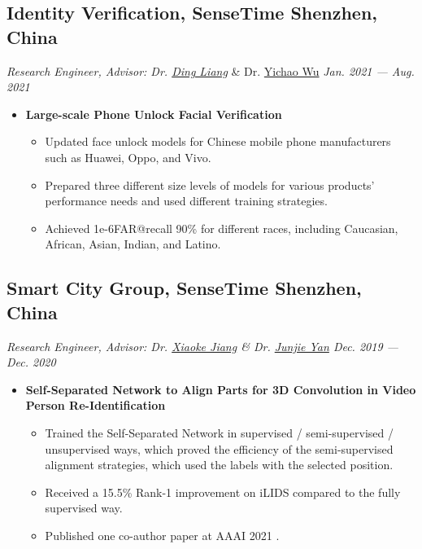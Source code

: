 \documentclass[a4,10pt]{article}
\newcommand{\subtext}[1]{
#1\par\vspace{-0.2cm}}
\newenvironment{zitemize}{
\begin{itemize}\itemsep0pt \parskip0pt \parsep1pt}
{\end{itemize}\vspace{-0.5cm}}
\begin{document}
\subsection*{Identity Verification, SenseTime \hfill Shenzhen, China} 
\subtext{\textit{Research Engineer, Advisor: Dr. \href{https://scholar.google.com/citations?user=Dqjnn0gAAAAJ&hl=zh-CN}{Ding Liang}} \& Dr. \href{https://scholar.google.com/citations?user=20Its9kAAAAJ&hl=en} {Yichao Wu} \hfill \textit{Jan. 2021 --- Aug. 2021}}
    \begin{zitemize}
        \item \textbf{Large-scale Phone Unlock Facial Verification}
            \begin{itemize} 

                \item Updated face unlock models for Chinese mobile phone manufacturers such as Huawei, Oppo, and Vivo.
                \item Prepared three different size levels of models for various products' performance needs and used different training strategies.
                \item Achieved 1e-6FAR@recall 90\% for different races, including Caucasian, African, Asian, Indian,  and Latino.
                
            \end{itemize}
    \end{zitemize}

\subsection*{Smart City Group, SenseTime \hfill Shenzhen, China} 
\subtext{\textit{Research Engineer, Advisor: Dr. \href{https://shockjiang.github.io/} {Xiaoke Jiang}  \& Dr. \href{https://scholar.google.com/citations?user=rEYarG0AAAAJ&hl=en}{Junjie Yan} \hfill Dec. 2019 --- Dec. 2020}}
    \begin{zitemize}
        \item \textbf{Self-Separated Network to Align Parts for 3D Convolution in Video Person Re-Identification}
            \begin{itemize} 
                \item Trained the Self-Separated Network in supervised / semi-supervised / unsupervised ways, which proved the efficiency of the semi-supervised alignment strategies, which used the labels with the selected position. 
                \item Received a 15.5\% Rank-1 improvement on iLIDS compared to the fully supervised way. 
                \item Published one co-author paper at AAAI 2021 \cite{Pap1}.
            \end{itemize}
            
    \end{zitemize}
\end{document}

